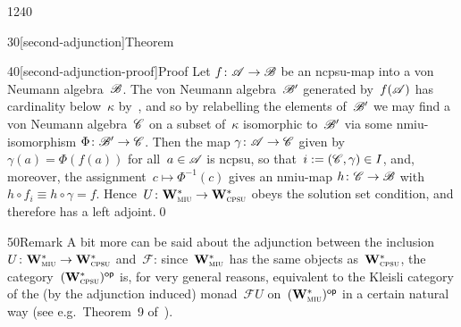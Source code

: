 \begin{parsec}{1240}
\begin{point}{30}[second-adjunction]{Theorem}
\begin{point}{40}[second-adjunction-proof]{Proof}
Let $f\colon \mathscr{A}\to\mathscr{B}$
be an ncpsu-map
into a von Neumann algebra~$\mathscr{B}$.
The von Neumann algebra~$\mathscr{B}'$ generated by~$f(\mathscr{A})$
has cardinality below~$\kappa$
by~,
and so by relabelling the elements of~$\mathscr{B}'$
we may find a von Neumann algebra~$\mathscr{C}$
on a subset of~$\kappa$
isomorphic to~$\mathscr{B}'$
via some nmiu-isomorphism $\Phi\colon \mathscr{B}'\to\mathscr{C}$.
Then the map $\gamma\colon \mathscr{A}\to \mathscr{C}$
given by~$\gamma(a)=\Phi(f(a))$ for all~$a\in\mathscr{A}$
is ncpsu,
so that~$i:=(\mathscr{C},\gamma)\in I$,
and, moreover,
the assignment~$c\mapsto \Phi^{-1}(c)$
gives an nmiu-map $h\colon \mathscr{C}\to \mathscr{B}$
with~$h\circ f_i \equiv h\circ \gamma=f$.
Hence~$U\colon \mathbf{W}^*_{\text{\textsc{miu}}}\to\mathbf{W}^*_{\text{\textsc{cpsu}}}$
obeys the solution set condition,
and therefore has a left adjoint.\qed
\end{point}
\begin{point}{50}{Remark}%
A bit more can be said
about the adjunction between the inclusion~$U\colon \mathbf{W}^*_{\text{\textsc{miu}}}\to\mathbf{W}^*_{\text{\textsc{cpsu}}}$
and~$\mathcal{F}$:
since~$\mathbf{W}^*_{\text{\textsc{miu}}}$ has the same objects as~$\mathbf{W}^*_{\text{\textsc{cpsu}}}$,
the category~${(\mathbf{W}^*_{\text{\textsc{cpsu}}})}{^{\mathsf{op}}}$
is, for very general reasons, equivalent
to the Kleisli category
	of the (by the adjunction induced) monad~$\mathcal{F}U$ 
on~${(\mathbf{W}^*_{\text{\textsc{miu}}})}{^{\mathsf{op}}}$
in a certain natural way
(see e.g.~Theorem~9 of~\cite{qpakm}).
\end{point}
\end{point}
\end{parsec}
